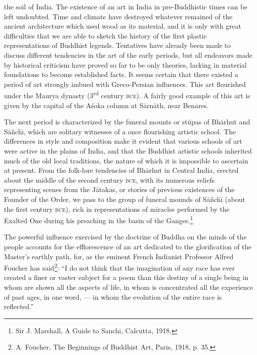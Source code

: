 \documentclass[a4paper, 12pt, oneside]{article}
\begin{document}
the soil of India. The existence of an art in India in pre-Buddhistic times can be left undoubted. Time and climate have destroyed whatever remained of the ancient architecture which used wood as its material, and it is only with great difficulties that we are able to sketch the history of the first plastic representations of Buddhist legends. Tentatives have already been made to discuss different tendencies in the art of the early periods, but all endeavors made by historical criticism have proved so far to be only theories, lacking in material foundations to become established facts. It seems certain that there existed a period of art strongly imbued with Greco-Persian influences. This art flourished under the Maurya dynasty (3\textsuperscript{rd} century \textsc{bce}). A fairly good example of this art is given by the capital of the A\'{s}oka column at S\={a}rn\={a}th, near Benares.

The next period is characterized by the funeral mounts or st\={u}pas of Bh\={a}rhut and S\={a}\~{n}ch\={\i}, which are solitary witnesses of a once flourishing artistic school. The differences in style and composition make it evident that various schools of art were active in the plains of India, and that the Buddhist artistic schools inherited much of the old local traditions, the nature of which it is impossible to ascertain at present. From the folk-lore tendencies of Bh\={a}rhut in Central India, erected about the middle of the second century \textsc{bce}, with its numerous reliefs representing scenes from the J\={a}takas, or stories of previous existences of the Founder of the Order, we pass to the group of funeral mounds of S\={a}\~{n}ch\={\i} (about the first century \textsc{bce}), rich in representations of miracles performed by the Exalted One during his preaching in the basin of the Ganges.\footnote{Sir J. Marshall, A Guide to Sanchi, Calcutta, 1918.}

The powerful influence exercised by the doctrine of Buddha on the minds of the people accounts for the efflorescence of an art dedicated to the glorification of the Master's earthly path, for, as the eminent French Indianist Professor Alfred Foucher has said\footnote{A. Foucher, The Beginnings of Buddhist Art, Paris, 1918, p. 35.}: ``I do not think that the imagination of any race has ever created a finer or vaster subject for a poem than this destiny of a single being in whom are shown all the aspects of life, in whom is concentrated all the experience of past ages, in one word, --- in whom the evolution of the entire race is reflected.''
\end{document}
